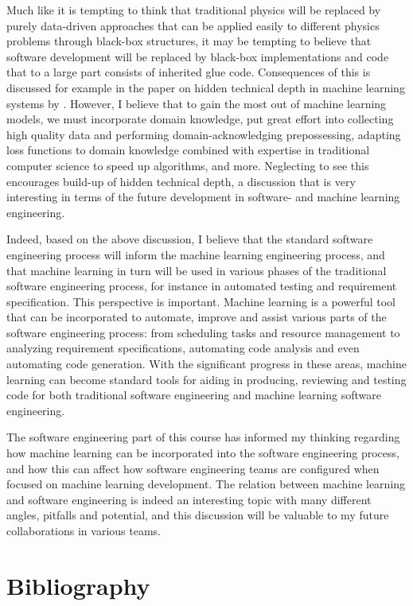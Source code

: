 \documentclass{article}
\begin{document}
Much like it is tempting to think that traditional physics will be replaced by purely data-driven approaches that can be applied easily to different physics problems through black-box structures, it may be tempting to believe that software development will be replaced by black-box implementations and code that to a large part consists of inherited glue code. Consequences of this is discussed for example in the paper on hidden technical depth in machine learning systems by \citet{depth}. However, I believe that to gain the most out of machine learning models, we must incorporate domain knowledge, put great effort into collecting high quality data and performing domain-acknowledging prepossessing, adapting loss functions to domain knowledge combined with expertise in traditional computer science to speed up algorithms, and more. Neglecting to see this encourages build-up of hidden technical depth, a discussion that is very interesting in terms of the future development in software- and machine learning engineering. 

Indeed, based on the above discussion, I believe that the standard software engineering process will inform the machine learning engineering process, and that machine learning in turn will be used in various phases of the traditional software engineering process, for instance in automated testing and requirement specification. This perspective is important. Machine learning is a powerful tool that can be incorporated to automate, improve and assist various parts of the software engineering process: from scheduling tasks and resource management to analyzing requirement specifications, automating code analysis and even automating code generation. With the significant progress in these areas, machine learning can become standard tools for aiding in producing, reviewing and testing code for both traditional software engineering and machine learning software engineering. 

The software engineering part of this course has informed my thinking regarding how machine learning can be incorporated into the software engineering process, and how this can affect how software engineering teams are configured when focused on machine learning development. The relation between machine learning and software engineering is indeed an interesting topic with many different angles, pitfalls and potential, and this discussion will be valuable to my future collaborations in various teams. 

\section{Bibliography}

\end{document}
